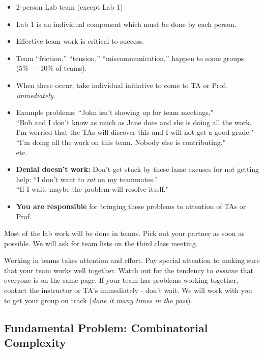 \begin{itemize}
        \item  2-person Lab team (except Lab 1)
        \item  Lab 1 is an individual component which must be done by each person. 
        \item Effective team work is critical to success.
        \item Team ``friction,'' ``tension,'' ``miscommunication,''
        happen to some groups. (5\% --- 10\% of teams).
        \item When these occur, take individual initiative to come
        to TA or Prof. {\it immediately}.
        \item Example problems: ``John isn't showing up for team meetings," \\
        ``Bob and I don't know as much as Jane does and
        she is doing all the work.  I'm worried that the TAs will discover
        this and I will not get a good grade." \\
        ``I'm doing all the work on this team.  Nobody else is contributing."\\
        etc.
        \item {\bf Denial doesn't work:} Don't get stuck by these lame excuses
        for not getting help: ``I don't want to {\it rat} on my teammates."\\
        ``If I wait, maybe the problem will resolve itself."
        \item {\bf You are responsible} for bringing these problems to
        attention of TAs or Prof.
\end{itemize}


Most of the lab work will be done in teams. Pick  out your partner as soon as possible.
We will ask for team lists on the third class meeting.

Working in teams takes attention and effort.
Pay special attention to making sure that your team works well together.
Watch out for the tendency to {\it assume } that everyone is on the
same page.  If your team has problems working together, contact the
instructor or TA's immediately - don't wait. 
We will work with you to get your group on track ({\it done it many times in the past}).


\subsection{Fundamental Problem: Combinatorial Complexity}

